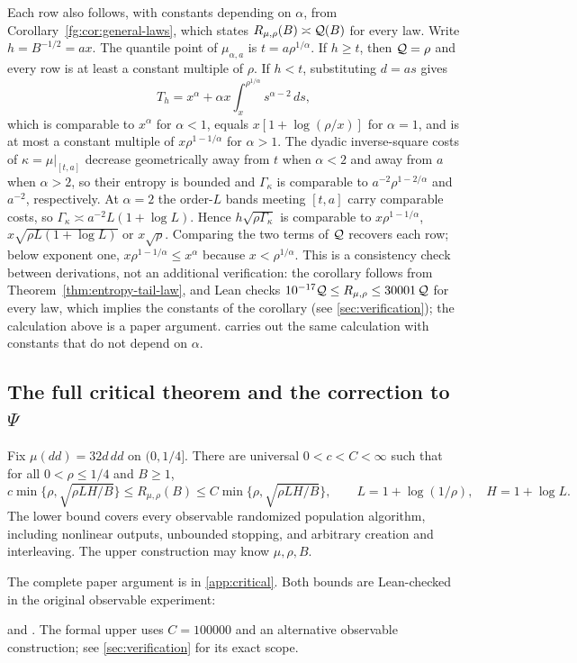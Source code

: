 \begin{remark}\label{rem:power-quantile}
Each row also follows, with constants depending on $\alpha$, from
Corollary~\ref{fg:cor:general-laws}, which states
$R_{\mu,\rho}(B)\asymp\mathcal Q(B)$ for every law. Write $h=B^{-1/2}=ax$.
The quantile point of $\mu_{\alpha,a}$ is $t=a\rho^{1/\alpha}$. If
$h\ge t$, then $\mathcal Q=\rho$ and every row is at least a constant multiple
of $\rho$. If $h<t$, substituting $d=as$ gives
\[
 T_h=x^\alpha+\alpha x\int_x^{\rho^{1/\alpha}}s^{\alpha-2}\,ds,
\]
which is comparable to $x^\alpha$ for $\alpha<1$, equals
$x[1+\log(\rho/x)]$ for $\alpha=1$, and is at most a constant multiple of
$x\rho^{1-1/\alpha}$ for $\alpha>1$. The dyadic inverse-square costs of
$\kappa=\mu|_{[t,a]}$ decrease geometrically away from $t$ when
$\alpha<2$ and away from $a$ when $\alpha>2$, so their entropy is bounded
and $\Gamma_\kappa$ is comparable to $a^{-2}\rho^{1-2/\alpha}$ and $a^{-2}$,
respectively. At $\alpha=2$ the order-$L$ bands meeting $[t,a]$ carry
comparable costs, so $\Gamma_\kappa\asymp a^{-2}L(1+\log L)$. Hence
$h\sqrt{\rho\Gamma_\kappa}$ is comparable to $x\rho^{1-1/\alpha}$,
$x\sqrt{\rho L(1+\log L)}$ or $x\sqrt\rho$. Comparing the two terms of $\mathcal Q$
recovers each row; below exponent one, $x\rho^{1-1/\alpha}\le x^\alpha$
because $x<\rho^{1/\alpha}$. This is a consistency check between
derivations, not an additional verification: the corollary follows from
Theorem~\ref{thm:entropy-tail-law}, and Lean checks
$10^{-17}\mathcal Q\le R_{\mu,\rho}\le30001\,\mathcal Q$ for every law, which implies the
constants of the corollary (see \cref{sec:verification}); the calculation
above is a paper argument.  carries out the same
calculation with constants that do not depend on $\alpha$.
\end{remark}

\subsection{The full critical theorem and the correction to \texorpdfstring{$\Psi$}{Psi}}
\begin{theorem}\label{thm:v5-critical}
Fix $\mu(dd)=32d\,dd$ on $(0,1/4]$. There are universal
$0<c<C<\infty$ such that for all $0<\rho\le1/4$ and $B\ge1$,
\[
 c\min\{\rho,\sqrt{\rho L H/B}\}
 \le R_{\mu,\rho}(B)
 \le C\min\{\rho,\sqrt{\rho L H/B}\},\qquad
 L=1+\log(1/\rho),\quad H=1+\log L.
\]
The lower bound covers every observable randomized population algorithm,
including nonlinear outputs, unbounded stopping, and arbitrary creation
and interleaving. The upper construction may know $\mu,\rho,B$.
\end{theorem}
\noindent The complete paper argument is in \cref{app:critical}.
Both bounds are Lean-checked in the original observable experiment:
\par\noindent
{}
and .
The formal upper uses $C=100000$ and an alternative observable construction;
see \cref{sec:verification} for its exact scope.

